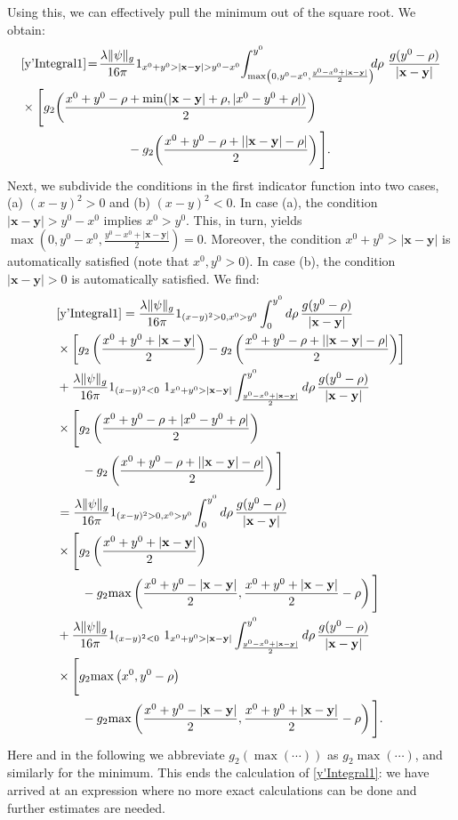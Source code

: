 \documentclass[b5paper,draft,openbib,12pt]{memoir}
\newcommand{\vx}{\mathbf{x}}
\newcommand{\vy}{\mathbf{y}}
\begin{document}
Using this, we can effectively pull the minimum out of 
the square root. We obtain:
\begin{align}\nonumber
    &\eqref{y'Integral1} \!=\!\frac{\lambda \|\psi\|_g}{16\pi} 1_{x^0+y^0>|\vx-\vy|>y^0-x^0}\! \int_{\max\left(0,y^0-x^0,\frac{y^0-x^0+|\vx-\vy|}{2}\right)}^{y^0} \!\!\!d\rho ~ \frac{ g(y^0-\rho)}{|\vx-\vy|}\\ 
    &\times\Bigg[ g_2\!\left(\frac{x^0+y^0-\rho + \min(|\vx-\vy|+\rho,|x^0-y^0+\rho|)}{2}\right)\notag\\
    &\hspace{3cm}-g_2\!\left(\frac{x^0+y^0-\rho + ||\vx-\vy|-\rho|}{2}\right)\Bigg].
\label{CasesFirstTermEnd}
\end{align}
Next, we subdivide the conditions in the first 
indicator function into two cases, (a) $(x-y)^2>0$ and 
(b) $(x-y)^2<0$. In case (a), the condition 
$|\vx-\vy|>y^0-x^0$ implies $x^0>y^0$. This, in turn, 
yields $\max\left(0,y^0-x^0,\frac{y^0-x^0+|\vx-\vy|}{2}
\right) = 0$.  Moreover, the condition 
$x^0+y^0>|\vx-\vy|$ is automatically satisfied (note 
that $x^0,y^0>0$). In case (b), the condition 
$|\vx-\vy|>0$ is automatically satisfied. We find:
\begin{align}
 \nonumber
     &\eqref{y'Integral1} = \frac{\lambda \|\psi\|_g}{16\pi} 1_{(x-y)^2>0, x^0>y^0} \int_{0}^{y^0} d\rho  \, \frac{ g(y^0-\rho)}{|\vx-\vy|}\\\nonumber
    &\times\left[ g_2\left(\frac{x^0+y^0 + |\vx-\vy|}{2}\right)
    -g_2\left(\frac{x^0+y^0-\rho + ||\vx-\vy|-\rho|}{2}\right)\right]\\\nonumber
    &+ \frac{\lambda \|\psi\|_g}{16\pi} 1_{(x-y)^2<0}~1_{ x^0+y^0>|\vx-\vy|} \int_{\frac{y^0-x^0+|\vx-\vy|}{2}}^{y^0} d\rho \, \frac{ g(y^0-\rho)}{|\vx-\vy|}\\\nonumber
    &\times \Bigg[ g_2\left(\frac{x^0+y^0-\rho + |x^0-y^0+\rho|}{2}\right)\\\notag
    &\quad \quad -g_2\left(\frac{x^0+y^0-\rho + ||\vx-\vy|-\rho|}{2}\right)\Bigg]\\\nonumber
    &= \frac{\lambda \|\psi\|_g}{16\pi} 1_{(x-y)^2>0, x^0>y^0} \int_{0}^{y^0} d\rho \, \frac{ g(y^0-\rho)}{|\vx-\vy|}\\\nonumber
    &\times \Bigg[ g_2\left(\frac{x^0+y^0 + |\vx-\vy|}{2}\right)\\\notag
    &\quad \quad -g_2\!\max\left(\frac{x^0+y^0- |\vx-\vy|}{2},\frac{x^0+y^0+ |\vx-\vy|}{2}-\rho\right)\Bigg]\\\nonumber
    &+ \frac{\lambda \|\psi\|_g}{16\pi} 1_{(x-y)^2<0}~1_{ x^0+y^0>|\vx-\vy|} \int_{\frac{y^0-x^0+|\vx-\vy|}{2}}^{y^0} d\rho \, \frac{ g(y^0-\rho)}{|\vx-\vy|}\\
    &\times\Bigg[ g_2\!\max\left(x^0,y^0-\rho\right)\notag\\
    &\quad \quad -g_2\!\max\left(\frac{x^0+y^0-|\vx-\vy|}{2},\frac{x^0+y^0+|\vx-\vy|}{2}-\rho\right)\Bigg].
\label{eq:resulty'Integral1}
\end{align}
Here and in the following we abbreviate 
$g_2(\max(\cdots))$ as $g_2 \max (\cdots)$, and 
similarly for the minimum. This ends the calculation 
of \eqref{y'Integral1}: we have arrived at an 
expression where no more exact calculations can be 
done and further estimates are needed.
\end{document}
